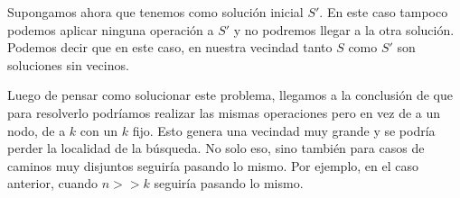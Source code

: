Supongamos ahora que tenemos como solución inicial $S'$. En este caso tampoco podemos aplicar ninguna operación a $S'$ y no podremos llegar a la otra solución. Podemos decir que en este caso, en nuestra vecindad tanto $S$ como $S'$ son soluciones sin vecinos.

Luego de pensar como solucionar este problema, llegamos a la conclusión de que para resolverlo podríamos realizar las mismas operaciones pero en vez de a un nodo, de a $k$ con un $k$ fijo. Esto genera una vecindad muy grande y se podría perder la localidad de la búsqueda. No solo eso, sino también para casos de caminos muy disjuntos seguiría pasando lo mismo. Por ejemplo, en el caso anterior, cuando $n >> k$ seguiría pasando lo mismo.

